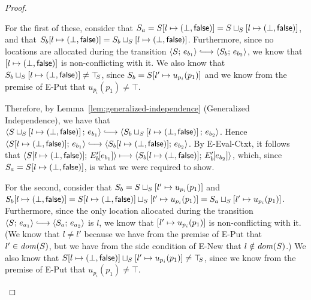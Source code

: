 \begin{proof}
\begin{enumerate}
\begin{enumerate}
      For the first of these, consider that $S_a =
      S[l \mapsto (\bot, \textsf{false})] =
      S \sqcup_{S} \left[ l \mapsto (\bot, \textsf{false}) \right]$, and that
      $S_b[l \mapsto (\bot, \textsf{false})] =
      S_b \sqcup_{S} \left[ l \mapsto (\bot, \textsf{false}) \right]$.
      Furthermore, since no locations are allocated during the
      transition $\config{S}{e_{b_1}} \parstepsto
      \config{S_b}{e_{b_2}}$, we know that
      $\left[ l \mapsto (\bot, \textsf{false}) \right]$ is non-conflicting with it.
      We also know that
      $S_b \sqcup_{S} \left[ l \mapsto (\bot, \textsf{false}) \right] \neq \top\hspace{-0.85mm}_{S}$,
      since $S_b = S[l' \mapsto u_{p_i}(p_1)]$ and we know
      from the premise of {\sc E-Put} that $u_{p_i}(p_1) \neq
      \top$.


      Therefore, by Lemma~\ref{lem:generalized-independence}
      (Generalized Independence), we have that
      $\config{\lubstore{S}{\store{\storebinding{l}{\bot}{\frozenfalse}}}}{e_{b_1}}
      \parstepsto
      \config{\lubstore{S_b}{\store{\storebinding{l}{\bot}{\frozenfalse}}}}{e_{b_2}}$.
      Hence $\config{\extS{S}{l}{\bot}{\frozenfalse}}{e_{b_1}}
      \parstepsto
      \config{\extS{S_b}{l}{\bot}{\frozenfalse}}{e_{b_2}}$.  By {\sc
        E-Eval-Ctxt}, it follows that
      $\langle S[l \mapsto (\bot, \textsf{false})];\, E'_b\hspace{-1mm}\left[e_{b_1}\right] \rangle
      \longmapsto
      \langle S_b[l \mapsto (\bot, \textsf{false})];\, E'_b\hspace{-1mm}\left[e_{b_2}\right] \rangle$,
      which, since $S_a = S[l \mapsto (\bot, \textsf{false})]$, is what we
      were required to show.

      For the second, consider that $S_b =
      S \sqcup_{S} \left[ l' \mapsto u_{p_i}(p_1) \right]$
      and $S_b[l \mapsto (\bot, \textsf{false})] =
      S[l \mapsto (\bot, \textsf{false})] \sqcup_{S} \left[ l' \mapsto u_{p_i}(p_1) \right]
      =
      S_a \sqcup_{S} \left[ l' \mapsto u_{p_i}(p_1) \right]$.
      Furthermore, since the only location allocated during the
      transition $\config{S}{e_{a_1}} \parstepsto
      \config{S_a}{e_{a_2}}$ is $l$, we know that
      $\left[ l' \mapsto u_{p_i}(p_1) \right]$ is
      non-conflicting with it.  (We know that $l \neq l'$ because we
      have from the premise of {\sc E-Put} that $l' \in \mathit{dom}(S)$, but
      we have from the side condition of {\sc E-New} that $l \notin
      \mathit{dom}(S)$.)  We also know that
      $S[l \mapsto (\bot, \textsf{false})] \sqcup_{S} \left[ l' \mapsto u_{p_i}(p_1) \right]
      \neq \top\hspace{-0.85mm}_{S}$, since we know from the premise of {\sc E-Put} that
      $u_{p_i}(p_1) \neq \top$.


\end{enumerate}
\end{enumerate}
\end{proof}
